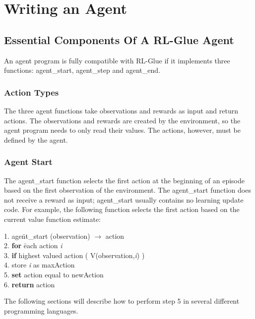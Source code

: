 \documentclass[11pt]{article}
\begin{document}
\section{Writing an Agent}
\label{agent}

\subsection{Essential Components Of A RL-Glue Agent}
\label{agentp1}

An agent program is fully compatible with RL-Glue if it implements three functions: agent\_start, agent\_step and agent\_end. 

\subsubsection{Action Types}
The three agent functions take observations and rewards as input and return actions. The observations and rewards are created by the environment, so the agent program needs to only read their values. The actions, however, must be defined by the agent.

\subsubsection{Agent Start}
The agent\_start function selects the first action at the beginning of an episode based on the first observation of the environment. The agent\_start function does not receive a reward as input; agent\_start usually contains no learning update code. For example, the following function selects the first action based on the current value function estimate:
\begin{tabbing}
1. age\=nt\_start (observation) $\rightarrow$ action\\
2. \> {\bf for} \= each action {\it i}\\
3.\>\> {\bf if} highest valued action ( V(observation,{\it i}) )\\ 
4. \> store {\it i} as maxAction\\
5. \> {\bf set} action equal to newAction\\
6. {\bf return} action
\end{tabbing}
The following sections will describe how to perform step 5 in several different programming languages.
\end{document}
